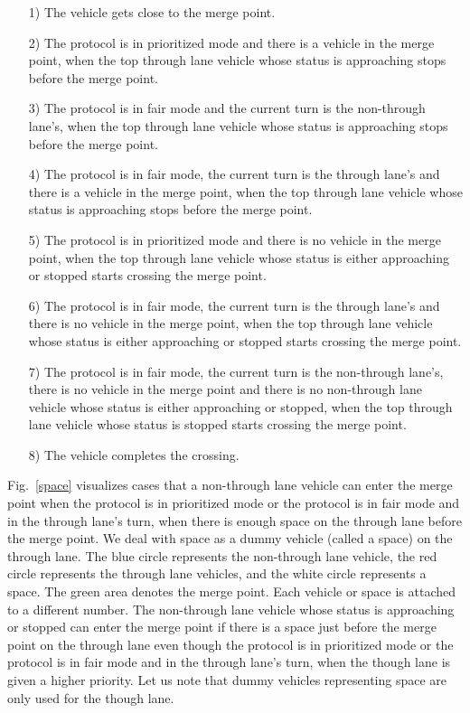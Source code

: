 \documentclass[10pt, conference, compsocconf]{IEEEtran}
\newcommand*\circled[1]{\tikz[baseline=(char.base)]{
            \node[shape=circle,draw,inner sep=2pt] (char) {#1};}}
\begin{document}
\begin{itemize}[]
    \item[1)] The vehicle gets close to the merge point. %
    \item[2)] The protocol is in prioritized mode and there is a vehicle in the merge point, when the top through lane vehicle whose status is approaching stops before the merge point. %
    \item[3)] The protocol is in fair mode and the current turn is the non-through lane's, when the top through lane vehicle whose status is approaching stops before the merge point. %
    \item[4)] The protocol is in fair mode, the current turn is the through lane's and there is a vehicle in the merge point, when the top through lane vehicle whose status is approaching stops before the merge point. %
    \item[5)] The protocol is in prioritized mode and there is no vehicle in the merge point, when the top through lane vehicle whose status is either approaching or stopped starts crossing the merge point. %
    \item[6)] The protocol is in fair mode, the current turn is the through lane's and there is no vehicle in the merge point, when the top through lane vehicle whose status is either approaching or stopped starts crossing the merge point. %
    \item[7)] The protocol is in fair mode, the current turn is the non-through lane's, there is no vehicle in the merge point and there is no non-through lane vehicle whose status is either approaching or stopped, when the top through lane vehicle whose status is stopped starts crossing the merge point. %
    \item[8)] The vehicle completes the crossing. %
\end{itemize}

Fig.~\ref{space} visualizes cases that a non-through lane vehicle can
enter the merge point when the protocol is in prioritized mode or the
protocol is in fair mode and in the through lane's turn, when there is
enough space on the through lane before the merge point.  We deal with
space as a dummy vehicle (called a space) on the through lane.  The
blue circle represents the non-through lane vehicle, the red circle
represents the through lane vehicles, and the white circle represents
a space. The green area denotes the merge point. Each vehicle or space
is attached to a different number.  The non-through lane vehicle
{\scriptsize\circled{1}} whose status is approaching or stopped can
enter the merge point if there is a space {\scriptsize\circled{2}}
just before the merge point on the through lane even though the
protocol is in prioritized mode or the protocol is in fair mode and in
the through lane's turn, when the though lane is given a higher
priority. Let us note that dummy vehicles representing space are only
used for the though lane.
\end{document}
